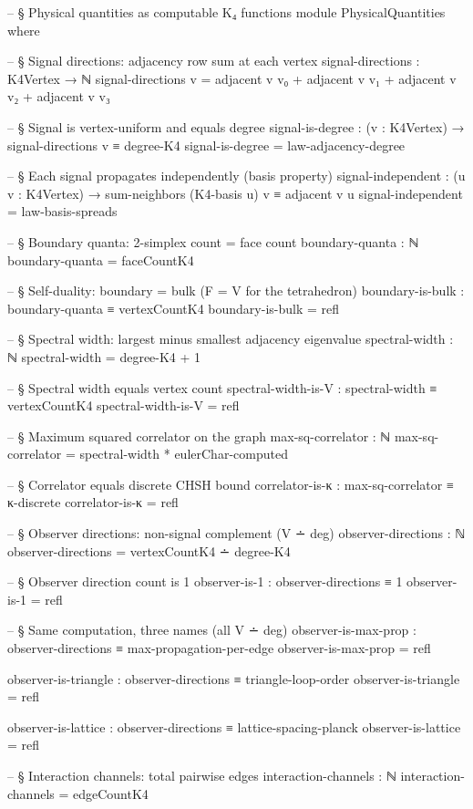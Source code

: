 \documentclass[11pt,a4paper]{book}
\begin{document}
\begin{code}
-- § Physical quantities as computable K₄ functions
module PhysicalQuantities where

  -- § Signal directions: adjacency row sum at each vertex
  signal-directions : K4Vertex → ℕ
  signal-directions v =
    adjacent v v₀ + adjacent v v₁ + adjacent v v₂ + adjacent v v₃

  -- § Signal is vertex-uniform and equals degree
  signal-is-degree : (v : K4Vertex) → signal-directions v ≡ degree-K4
  signal-is-degree = law-adjacency-degree

  -- § Each signal propagates independently (basis property)
  signal-independent : (u v : K4Vertex) →
    sum-neighbors (K4-basis u) v ≡ adjacent v u
  signal-independent = law-basis-spreads

  -- § Boundary quanta: 2-simplex count = face count
  boundary-quanta : ℕ
  boundary-quanta = faceCountK4

  -- § Self-duality: boundary = bulk (F = V for the tetrahedron)
  boundary-is-bulk : boundary-quanta ≡ vertexCountK4
  boundary-is-bulk = refl

  -- § Spectral width: largest minus smallest adjacency eigenvalue
  spectral-width : ℕ
  spectral-width = degree-K4 + 1

  -- § Spectral width equals vertex count
  spectral-width-is-V : spectral-width ≡ vertexCountK4
  spectral-width-is-V = refl

  -- § Maximum squared correlator on the graph
  max-sq-correlator : ℕ
  max-sq-correlator = spectral-width * eulerChar-computed

  -- § Correlator equals discrete CHSH bound
  correlator-is-κ : max-sq-correlator ≡ κ-discrete
  correlator-is-κ = refl

  -- § Observer directions: non-signal complement (V ∸ deg)
  observer-directions : ℕ
  observer-directions = vertexCountK4 ∸ degree-K4

  -- § Observer direction count is 1
  observer-is-1 : observer-directions ≡ 1
  observer-is-1 = refl

  -- § Same computation, three names (all V ∸ deg)
  observer-is-max-prop : observer-directions ≡ max-propagation-per-edge
  observer-is-max-prop = refl

  observer-is-triangle : observer-directions ≡ triangle-loop-order
  observer-is-triangle = refl

  observer-is-lattice : observer-directions ≡ lattice-spacing-planck
  observer-is-lattice = refl

  -- § Interaction channels: total pairwise edges
  interaction-channels : ℕ
  interaction-channels = edgeCountK4
\end{code}
\end{document}
